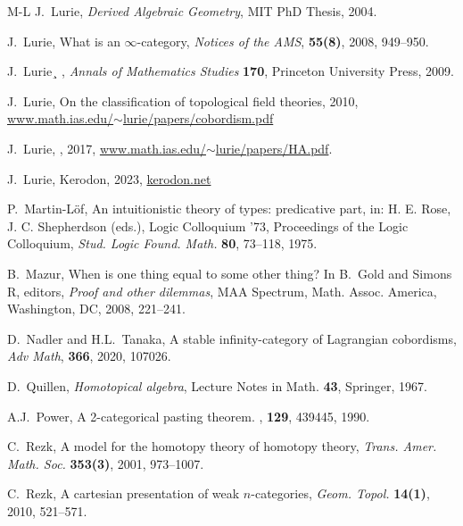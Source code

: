 \documentclass[11pt]{ctexart}
\theoremstyle{definition}
\theoremstyle{remark}
\numberwithin{equation}{section}
\newcommand{\1}{\mathbbe{1}}
\newcommand{\2}{\mathbbe{2}}
\newcommand{\3}{\mathbbe{3}}
\begin{document}
\begin{thebibliography}{M-L}
 J.~Lurie, \emph{Derived Algebraic Geometry}, MIT PhD Thesis, 2004.

 J.~Lurie, What is an $\infty$-category, {\em Notices of the AMS}, {\bf 55(8)}, 2008, 949--950.

     J.~Lurie¸
    , {\em Annals of Mathematics
      Studies} {\bf 170},
    \newblock Princeton University Press, 2009.
    
 J.~Lurie, On the classification of topological field theories, 2010, \href{https://www.math.ias.edu/~lurie/papers/cobordism.pdf}{www.math.ias.edu/$\sim$lurie/papers/cobordism.pdf}

     J.~Lurie,
    , 2017,
    \newblock  \href{http://www.math.ias.edu/~lurie/papers/HA.pdf}{www.math.ias.edu/$\sim$lurie/papers/HA.pdf}.

     J.~Lurie, Kerodon, 2023, \href{https://kerodon.net/}{kerodon.net}



 P.~Martin-L\"{o}f, An intuitionistic theory of types: predicative part, in: H. E. Rose, J. C. Shepherdson (eds.), Logic Colloquium '73, Proceedings of the Logic Colloquium, {\em Stud. Logic Found. Math.} {\bf 80}, 73--118,  1975.

 B.~Mazur, \newblock When is one thing equal to some other thing? \newblock In B.~Gold and Simons R, editors, {\em Proof and other dilemmas}, MAA  Spectrum, Math. Assoc. America, Washington, DC, 2008,  221--241.


 D.~Nadler and H.L.~Tanaka, A stable infinity-category of Lagrangian cobordisms, {\em Adv Math}, {\bf 366}, 2020, 107026.


     D.~Quillen, \emph{Homotopical algebra}, Lecture Notes in Math. {\bf 43}, Springer, 1967.
    
       A.J.~Power,     \newblock A 2-categorical pasting theorem. , {\bf 129}, 439{\textendash}445, 1990.
    
    
     C.~Rezk, A model for the homotopy theory of homotopy theory, {\em Trans. Amer. Math. Soc.} {\bf 353(3)},  2001, 973--1007.

     C.~Rezk, A cartesian presentation of weak $n$-categories, {\em
    Geom. Topol.} {\bf 14(1)}, 2010, 521--571.


\end{thebibliography}
\end{document}
